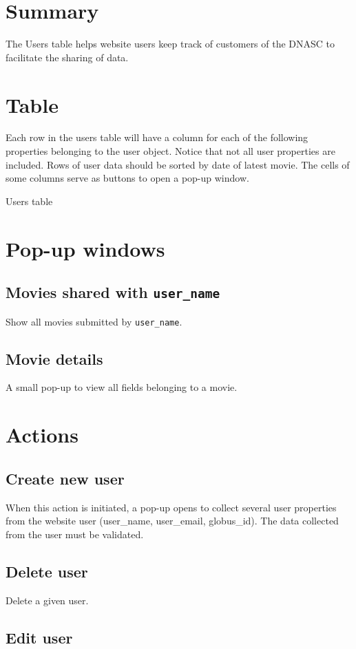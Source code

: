 \section{Summary}

The Users table helps website users keep track of customers of the DNASC to 
facilitate the sharing of data.

\section{Table}

Each row in the users table will have a column for each of the following 
properties belonging to the user object. Notice that not all user properties 
are included. Rows of user data should be sorted by date of latest movie. 
The cells of some columns serve as buttons to open a pop-up window.

\begin{table}[h]
    
    \caption{Users table}
\end{table}

\section{Pop-up windows}

\subsection{Movies shared with \texttt{user\_name}}

Show all movies submitted by \texttt{user\_name}.

\subsection{Movie details}

A small pop-up to view all fields belonging to a movie.

\section{Actions}

\subsection{Create new user}

When this action is initiated, a pop-up opens to collect several user 
properties from the website user (user\_name, user\_email, globus\_id). 
The data collected from the user must be validated. 

\subsection{Delete user}

Delete a given user.

\subsection{Edit user}


